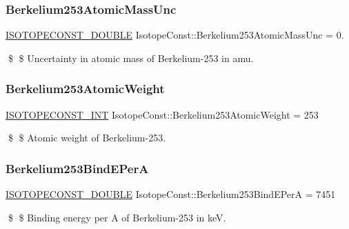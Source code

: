 \subsubsection{\texorpdfstring{Berkelium253\+Atomic\+Mass\+Unc}{Berkelium253AtomicMassUnc}}
{\footnotesize\ttfamily \mbox{\hyperlink{group___isotope_const-_macros_ga8f45a7272ce02c0b4c65c44636ed719a}{I\+S\+O\+T\+O\+P\+E\+C\+O\+N\+S\+T\+\_\+\+D\+O\+U\+B\+LE}} Isotope\+Const\+::\+Berkelium253\+Atomic\+Mass\+Unc = 0.}

\$ \$ Uncertainty in atomic mass of Berkelium-\/253 in amu. \mbox{\label{group___isotope_const-_berkelium-_bk253_gab37363f7ec2747b9747f314a6d5b3693}} 
\subsubsection{\texorpdfstring{Berkelium253\+Atomic\+Weight}{Berkelium253AtomicWeight}}
{\footnotesize\ttfamily \mbox{\hyperlink{group___isotope_const-_macros_ga5f18360b3e99483a35c32d789e62621c}{I\+S\+O\+T\+O\+P\+E\+C\+O\+N\+S\+T\+\_\+\+I\+NT}} Isotope\+Const\+::\+Berkelium253\+Atomic\+Weight = 253}

\$ \$ Atomic weight of Berkelium-\/253. \mbox{\label{group___isotope_const-_berkelium-_bk253_ga8d58066642c94f91a84bb0270321fd5c}} 
\subsubsection{\texorpdfstring{Berkelium253\+Bind\+E\+PerA}{Berkelium253BindEPerA}}
{\footnotesize\ttfamily \mbox{\hyperlink{group___isotope_const-_macros_ga8f45a7272ce02c0b4c65c44636ed719a}{I\+S\+O\+T\+O\+P\+E\+C\+O\+N\+S\+T\+\_\+\+D\+O\+U\+B\+LE}} Isotope\+Const\+::\+Berkelium253\+Bind\+E\+PerA = 7451}

\$ \$ Binding energy per A of Berkelium-\/253 in keV. \mbox{\label{group___isotope_const-_berkelium-_bk253_gac0ac39e43d5a283d68550cb4812d9b97}} 
